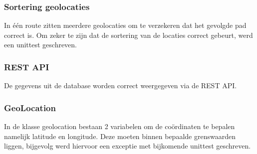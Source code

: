 \documentclass[ps,a4paper,oneside]{report}
\begin{document}
\subsubsection{Sortering geolocaties}
In \'e\'en route zitten meerdere geolocaties om te verzekeren dat het gevolgde pad correct is. Om zeker te zijn dat de sortering van de locaties correct gebeurt, werd een unittest geschreven.
\subsubsection{REST API}
De gegevens uit de database worden correct weergegeven via de REST API.
\subsubsection{GeoLocation}
In de klasse geolocation bestaan 2 variabelen om de co\"ordinaten te bepalen namelijk latitude en longitude. Deze moeten binnen bepaalde grenswaarden liggen, bijgevolg werd hiervoor een exceptie met bijkomende unittest geschreven.
\end{document}
